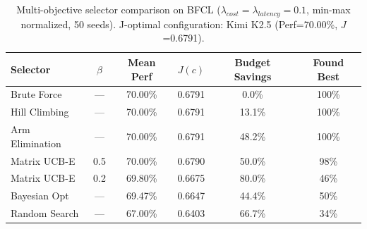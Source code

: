 \begin{table}[!htbp]
\centering
\small
\renewcommand{\arraystretch}{1.1}
\begin{tabular}{lccccc}
\toprule
\textbf{Selector} & \textbf{$\beta$} & \textbf{Mean Perf} & \textbf{$J(c)$} & \textbf{Budget Savings} & \textbf{Found Best} \\
\midrule
Brute Force & --- & 70.00\% & 0.6791 & 0.0\% & 100\% \\
\midrule
Hill Climbing & --- & 70.00\% & 0.6791 & 13.1\% & 100\% \\
Arm Elimination & --- & 70.00\% & 0.6791 & 48.2\% & 100\% \\
Matrix UCB-E & 0.5 & 70.00\% & 0.6790 & 50.0\% & 98\% \\
Matrix UCB-E & 0.2 & 69.80\% & 0.6675 & 80.0\% & 46\% \\
Bayesian Opt & --- & 69.47\% & 0.6647 & 44.4\% & 50\% \\
Random Search & --- & 67.00\% & 0.6403 & 66.7\% & 34\% \\
\bottomrule
\end{tabular}
\caption{Multi-objective selector comparison on BFCL ($\lambda_{cost}=\lambda_{latency}=0.1$, min-max normalized, 50 seeds). J-optimal configuration: Kimi K2.5 (Perf=70.00\%, $J$=0.6791).}
\label{tab:multiobjective-bfcl}
\end{table}
